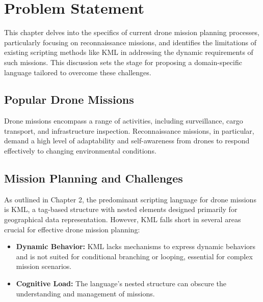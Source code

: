 \chapter{Problem Statement}
\label{sec:ProblemStatement}

This chapter delves into the specifics of current drone mission planning processes, particularly focusing on reconnaissance missions, and identifies the limitations of existing scripting methods like KML in addressing the dynamic requirements of such missions. This discussion sets the stage for proposing a domain-specific language tailored to overcome these challenges.

\section{Popular Drone Missions}
Drone missions encompass a range of activities, including surveillance, cargo transport, and infrastructure inspection. Reconnaissance missions, in particular, demand a high level of adaptability and self-awareness from drones to respond effectively to changing environmental conditions.

\section{Mission Planning and Challenges}
As outlined in Chapter 2, the predominant scripting language for drone missions is KML, a tag-based structure with nested elements designed primarily for geographical data representation. However, KML falls short in several areas crucial for effective drone mission planning:
\begin{itemize}
    \item \textbf{Dynamic Behavior:} KML lacks mechanisms to express dynamic behaviors and is not suited for conditional branching or looping, essential for complex mission scenarios.
    \item \textbf{Cognitive Load:} The language's nested structure can  obscure the understanding and management of missions.
\end{itemize}

